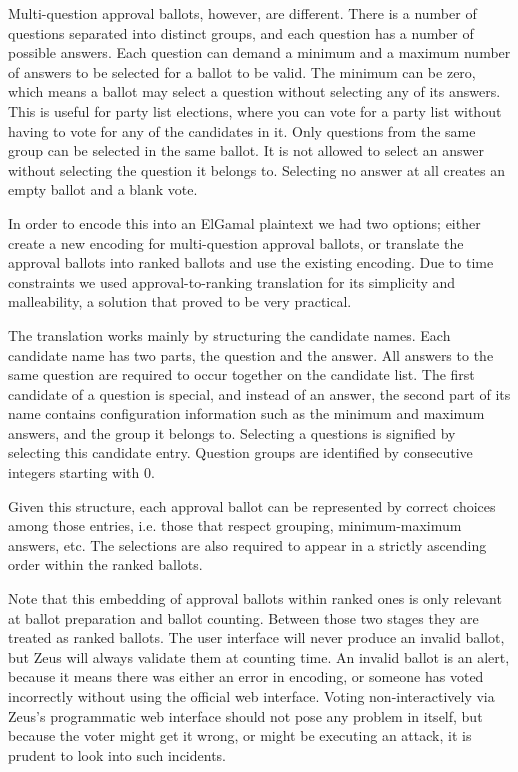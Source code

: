 \documentclass[jets]{usenixjournal}
\begin{document}
Multi-question approval ballots, however, are different.
There is a number of questions separated into distinct groups,
and each question has a number of possible answers.
Each question can demand a minimum and a maximum number of answers
to be selected for a ballot to be valid.
The minimum can be zero, which means a ballot may select a question
without selecting any of its answers.
This is useful for party list elections, where you can vote for
a party list without having to vote for any of the candidates in it.
Only questions from the same group can be selected in the same ballot.
It is not allowed to select an answer without selecting the question
it belongs to.
Selecting no answer at all creates an empty ballot and a blank vote.

In order to encode this into an ElGamal plaintext we had two options;
either create a new encoding for multi-question approval ballots,
or translate the approval ballots into ranked ballots and use the
existing encoding.
Due to time constraints we used approval-to-ranking translation for
its simplicity and malleability, a solution that proved to be very
practical.

The translation works mainly by structuring the candidate names.
Each candidate name has two parts, the question and the answer.
All answers to the same question are required to occur together
on the candidate list.
The first candidate of a question is special,
and instead of an answer, the second part of its name contains
configuration information such as the minimum and maximum answers,
and the group it belongs to.
Selecting a questions is signified by selecting this candidate entry.
Question groups are identified by consecutive integers starting with 0.

Given this structure, each approval ballot can be represented by
correct choices among those entries, i.e. those that respect
grouping, minimum-maximum answers, etc.
The selections are also required to appear in a strictly ascending order
within the ranked ballots.

Note that this embedding of approval ballots within ranked ones is
only relevant at ballot preparation and ballot counting.
Between those two stages they are treated as ranked ballots.
The user interface will never produce an invalid ballot,
but Zeus will always validate them at counting time.
An invalid ballot is an alert, because it means there was either
an error in encoding, or someone has voted incorrectly without using
the official web interface.
Voting non-interactively via Zeus's programmatic web interface
should not pose any problem in itself,
but because the voter might get it wrong,
or might be executing an attack,
it is prudent to look into such incidents.
\end{document}
